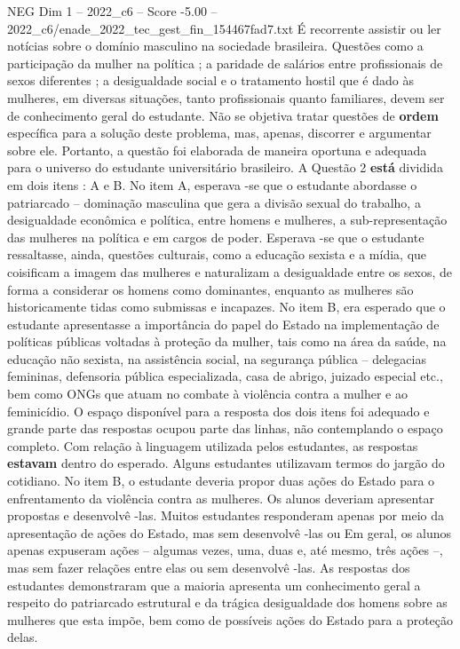 \begin{textsample}{NEG Dim 1 – 2022\_c6 – Score -5.00 – 2022\_c6/enade\_2022\_tec\_gest\_fin\_154467fad7.txt}
É recorrente assistir ou ler notícias sobre o domínio masculino na sociedade brasileira.
Questões como a participação da mulher na política ; a paridade de salários entre profissionais de sexos diferentes ; a desigualdade social e o tratamento hostil que é dado às mulheres, em diversas situações, tanto profissionais quanto familiares, devem ser de conhecimento geral do estudante.
Não se objetiva tratar questões de \textbf{ordem} específica para a solução deste problema, mas, apenas, discorrer e argumentar sobre ele.
Portanto, a questão foi elaborada de maneira oportuna e adequada para o universo do estudante universitário brasileiro.
A Questão 2 \textbf{está} dividida em dois itens : A e B.
No item A, esperava -se que o estudante abordasse o patriarcado – dominação masculina que gera a divisão sexual do trabalho, a desigualdade econômica e política, entre homens e mulheres, a sub-representação das mulheres na política e em cargos de poder.
Esperava -se que o estudante ressaltasse, ainda, questões culturais, como a educação sexista e a mídia, que coisificam a imagem das mulheres e naturalizam a desigualdade entre os sexos, de forma a considerar os homens como dominantes, enquanto as mulheres são historicamente tidas como submissas e incapazes.
No item B, era esperado que o estudante apresentasse a importância do papel do Estado na implementação de políticas públicas voltadas à proteção da mulher, tais como na área da saúde, na educação não sexista, na assistência social, na segurança pública – delegacias femininas, defensoria pública especializada, casa de abrigo, juizado especial etc., bem como ONGs que atuam no combate à violência contra a mulher e ao feminicídio.
O espaço disponível para a resposta dos dois itens foi adequado e grande parte das respostas ocupou parte das linhas, não contemplando o espaço completo.
Com relação à linguagem utilizada pelos estudantes, as respostas \textbf{estavam} dentro do esperado.
Alguns estudantes utilizavam termos do jargão do cotidiano.
No item B, o estudante deveria propor duas ações do Estado para o enfrentamento da violência contra as mulheres.
Os alunos deveriam apresentar propostas e desenvolvê -las.
Muitos estudantes responderam apenas por meio da apresentação de ações do Estado, mas sem desenvolvê -las ou Em geral, os alunos apenas expuseram ações – algumas vezes, uma, duas e, até mesmo, três ações –, mas sem fazer relações entre elas ou sem desenvolvê -las.
As respostas dos estudantes demonstraram que a maioria apresenta um conhecimento geral a respeito do patriarcado estrutural e da trágica desigualdade dos homens sobre as mulheres que esta impõe, bem como de possíveis ações do Estado para a proteção delas.

\end{textsample}
